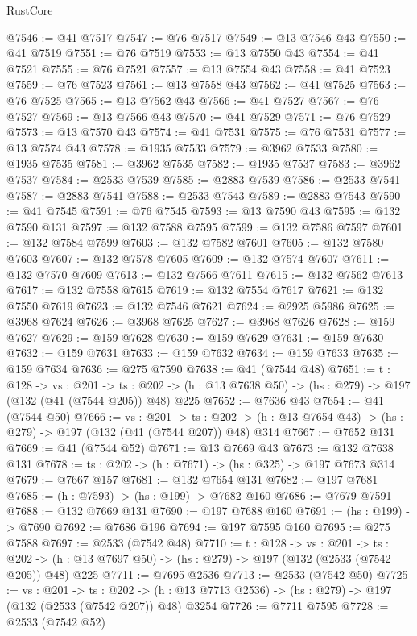 \begin{lexlean}{RustCore}
\begin{coremodule}
@7546 := @41 @7517
@7547 := @76 @7517
@7549 := @13 @7546 @43
@7550 := @41 @7519
@7551 := @76 @7519
@7553 := @13 @7550 @43
@7554 := @41 @7521
@7555 := @76 @7521
@7557 := @13 @7554 @43
@7558 := @41 @7523
@7559 := @76 @7523
@7561 := @13 @7558 @43
@7562 := @41 @7525
@7563 := @76 @7525
@7565 := @13 @7562 @43
@7566 := @41 @7527
@7567 := @76 @7527
@7569 := @13 @7566 @43
@7570 := @41 @7529
@7571 := @76 @7529
@7573 := @13 @7570 @43
@7574 := @41 @7531
@7575 := @76 @7531
@7577 := @13 @7574 @43
@7578 := @1935 @7533
@7579 := @3962 @7533
@7580 := @1935 @7535
@7581 := @3962 @7535
@7582 := @1935 @7537
@7583 := @3962 @7537
@7584 := @2533 @7539
@7585 := @2883 @7539
@7586 := @2533 @7541
@7587 := @2883 @7541
@7588 := @2533 @7543
@7589 := @2883 @7543
@7590 := @41 @7545
@7591 := @76 @7545
@7593 := @13 @7590 @43
@7595 := @132 @7590 @131
@7597 := @132 @7588 @7595
@7599 := @132 @7586 @7597
@7601 := @132 @7584 @7599
@7603 := @132 @7582 @7601
@7605 := @132 @7580 @7603
@7607 := @132 @7578 @7605
@7609 := @132 @7574 @7607
@7611 := @132 @7570 @7609
@7613 := @132 @7566 @7611
@7615 := @132 @7562 @7613
@7617 := @132 @7558 @7615
@7619 := @132 @7554 @7617
@7621 := @132 @7550 @7619
@7623 := @132 @7546 @7621
@7624 := @2925 @5986
@7625 := @3968 @7624
@7626 := @3968 @7625
@7627 := @3968 @7626
@7628 := @159 @7627
@7629 := @159 @7628
@7630 := @159 @7629
@7631 := @159 @7630
@7632 := @159 @7631
@7633 := @159 @7632
@7634 := @159 @7633
@7635 := @159 @7634
@7636 := @275 @7590
@7638 := @41 (@7544 @48)
@7651 := {t : @128} ->
  {vs : @201} ->
  {ts : @202} -> (h : @13 @7638 @50) -> (hs : @279) -> @197 (@132 (@41 (@7544 @205)) @48) @225
@7652 := @7636 @43
@7654 := @41 (@7544 @50)
@7666 := {vs : @201} ->
  {ts : @202} -> (h : @13 @7654 @43) -> (hs : @279) -> @197 (@132 (@41 (@7544 @207)) @48) @314
@7667 := @7652 @131
@7669 := @41 (@7544 @52)
@7671 := @13 @7669 @43
@7673 := @132 @7638 @131
@7678 := {ts : @202} -> (h : @7671) -> (hs : @325) -> @197 @7673 @314
@7679 := @7667 @157
@7681 := @132 @7654 @131
@7682 := @197 @7681
@7685 := (h : @7593) -> (hs : @199) -> @7682 @160
@7686 := @7679 @7591
@7688 := @132 @7669 @131
@7690 := @197 @7688 @160
@7691 := (hs : @199) -> @7690
@7692 := @7686 @196
@7694 := @197 @7595 @160
@7695 := @275 @7588
@7697 := @2533 (@7542 @48)
@7710 := {t : @128} ->
  {vs : @201} ->
  {ts : @202} -> (h : @13 @7697 @50) -> (hs : @279) -> @197 (@132 (@2533 (@7542 @205)) @48) @225
@7711 := @7695 @2536
@7713 := @2533 (@7542 @50)
@7725 := {vs : @201} ->
  {ts : @202} -> (h : @13 @7713 @2536) -> (hs : @279) -> @197 (@132 (@2533 (@7542 @207)) @48) @3254
@7726 := @7711 @7595
@7728 := @2533 (@7542 @52)

\end{coremodule}
\end{lexlean}
